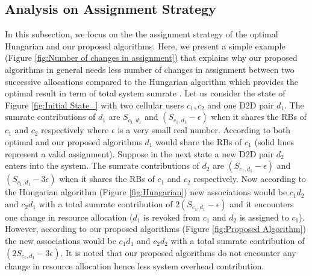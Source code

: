 \documentclass[times]{dacauth}
\begin{document}
\subsection{Analysis on Assignment Strategy}\label{assighment stragegy}
\smallskip
\noindent 
In this subsection, we focus on the the assignment strategy of the optimal Hungarian and our proposed algorithms. Here, we present a simple example  (Figure \ref{fig:Number of changes in assignment}) that explains why our proposed algorithms in general needs less number of changes in assignment between two successive allocations compared to the Hungarian algorithm which provides the optimal result in term of total system sumrate \cite{ccnc}. Let us consider the state of Figure \ref{fig:Initial State_} with two cellular users $ c_{1}, c_{2}$  and one D2D pair $d_{1}$. The sumrate contributions of $d_{1}$ are $S_{c_1,d_1}$ and $(S_{c_1, d_1}-\epsilon)$ when it shares the RBs of $ c_{1}$ and $ c_{2}$ respectively where $\epsilon$ is a very small real number. According to both optimal and our proposed algorithms $d_{1}$ would share the RBs of $c_{1}$ (solid lines  represent a valid assignment). Suppose in the next state a new D2D pair $d_{2}$ enters into the system. The sumrate contributions of $d_{2}$ are $(S_{c_1, d_1}-\epsilon)$ and $(S_{c_1, d_1}-3\epsilon)$ when it shares the RBs of $ c_{1}$ and $ c_{2}$ respectively. Now according to the Hungarian algorithm (Figure \ref{fig:Hungarian}) new associations would be $c_1d_2$ and $c_2d_1$ with a total sumrate contribution of $2(S_{c_1, d_1}-\epsilon)$ and it encounters one change in resource allocation ($d_{1}$ is revoked from $c_{1}$ and $d_{2}$ is assigned to $c_{1}$). However, according to our proposed algorithms (Figure \ref{fig:Proposed Algorithm}) the new associations would be $c_1d_1$ and $c_2d_2$ with a total sumrate contribution of $(2S_{c_1, d_1}-3\epsilon)$. It is noted that our proposed algorithms do not encounter any change in resource allocation hence less system overhead contribution.
\end{document}
